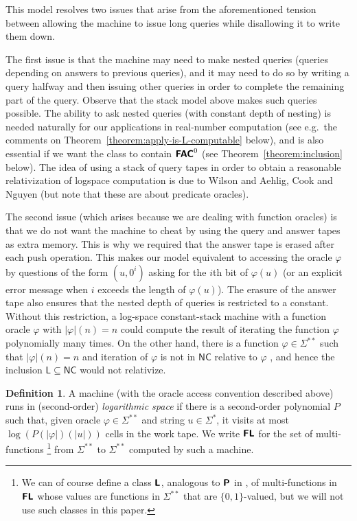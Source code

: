 \documentclass[conference]{IEEEtran}
\newcommand{\classonefont}[1]{\mathsf{#1}}
\newcommand{\classL}{\classonefont{L}}
\newcommand{\classNC}{\classonefont{NC}}
\newcommand{\classtwofont}[1]{\text{\bfseries \sffamily \upshape #1}}
\newcommand{\classLtwo}{\classtwofont{L}}
\newcommand{\classFLtwo}{\classtwofont{FL}}
\newcommand{\classFACtwo}{\classtwofont{FAC}}
\newcommand{\classPtwo}{\classtwofont{P}}
\newcommand{\LM}{\varSigma ^{**}}
\theoremstyle{definition}
\newtheorem{definition}[theorem]{Definition}
\theoremstyle{remark}
\begin{document}
This model resolves two issues that arise 
from the aforementioned tension between 
allowing the machine to issue long queries
while disallowing it to write them down. 

The first issue is that 
the machine may need to make nested queries 
(queries depending on answers to previous queries), and 
it may need to do so by writing a query halfway 
and then issuing other queries in order to complete the remaining part of the query.  
Observe that the stack model above makes such queries possible. 
The ability to ask nested queries (with constant depth of nesting) is needed naturally 
for our applications in real-number computation
(see e.g.\ the comments on Theorem~\ref{theorem:apply-is-L-computable} below), 
and is also essential if we want the class to contain
$\classFACtwo ^0$ 
(see Theorem~\ref{theorem:inclusion} below). 
The idea of using a stack of query tapes 
in order to obtain a reasonable relativization of logspace computation
is due to Wilson \cite{wilson1988measure} and 
Aehlig, Cook and Nguyen \cite{aehlig2007relativizing}
(but note that these are about predicate oracles). 

The second issue (which arises because we are dealing with function oracles) is that 
we do not want the machine to cheat by 
using the query and answer tapes as extra memory. 
This is why we required that 
the answer tape is erased after each push operation. 
This makes our model equivalent to 
accessing the oracle $\varphi$ by questions of the form $(u, 0 ^i)$ 
asking for the $i$th bit of $\varphi (u)$ (or an explicit error message 
when $i$ exceeds the length of $\varphi (u)$).
The erasure of the answer tape also
ensures that the nested depth of queries is restricted to a constant.
Without this restriction, a log-space constant-stack machine with 
a function oracle $\varphi$ with $|\varphi|(n) = n$ 
could compute the result of iterating the function $\varphi$ polynomially many times.
On the other hand, there is a function $\varphi \in \LM$ such that $|\varphi|(n) = n$
and iteration of $\varphi$ is not in $\classNC$ relative to $\varphi$ \cite{aehlig2007relativizing}, 
and hence the inclusion $\classL \subseteq \classNC$ would not relativize.

\begin{definition}
 A machine (with the oracle access convention described above) 
 runs in (second-order) \emph{logarithmic space}
 if there is a second-order polynomial $P$ such that, 
 given oracle $\varphi \in \LM$ and string $u \in \varSigma^*$, 
 it visits at most $\log(P(|\varphi|)(|u|))$ cells
 in the work tape.
 We write $\classFLtwo$ for the set of multi-functions%
\footnote{%
We can of course define a class $\classLtwo$, 
analogous to $\classPtwo$ in \cite{kawamura2012complexity}, 
of multi-functions in $\classFLtwo$ whose values are functions in $\LM$ 
that are $\{0, 1\}$-valued, 
but we will not use such classes in this paper. 
}
 from $\LM$ to $\LM$ 
 computed by such a machine.
\end{definition}
\end{document}
